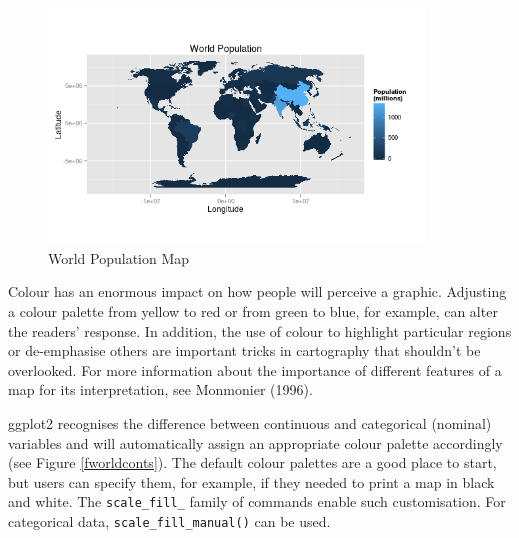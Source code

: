 \documentclass[]{article}
\let\Oldincludegraphics\includegraphics
\renewcommand{\includegraphics}[1]{\Oldincludegraphics[width=10cm]{#1}}
\begin{document}
\begin{figure}[htbp]
\centering
\includegraphics{figure/World_Population_Map.png}
\caption{World Population Map} \label{fworldpop}
\end{figure}

Colour has an enormous impact on how people will perceive a graphic.
Adjusting a colour palette from yellow to red or from green to blue, for
example, can alter the readers' response. In addition, the use of colour
to highlight particular regions or de-emphasise others are important
tricks in cartography that shouldn't be overlooked. For more
information about the importance of different features of a map for its
interpretation, see Monmonier (1996).

ggplot2 recognises the difference between continuous and categorical
(nominal) variables and will automatically assign an appropriate colour
palette accordingly (see Figure \ref{fworldconts}). The default colour palettes are a
good place to start, but users can specify them, for example, if they needed to print a  map in black and white. The
\texttt{scale\_fill\_} family of commands enable such customisation. For
categorical data, \texttt{scale\_fill\_manual()} can be used.
\end{document}
